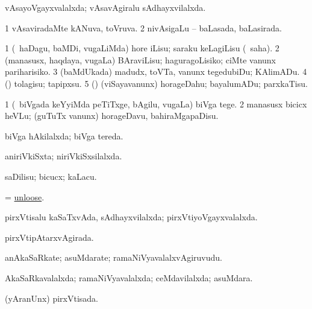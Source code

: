 \bentry
{} 
\gl{\gu}
\expl{}
\bmng
vAsayoVgayxvalalxda; vAsavAgiralu sAdhayxvilalxda. 
\emng
\eentry

\bentry
{} 
\gl{\gu}
\expl{}
\bmng
\bnum
\num{1} vAsaviradaMte kANuva, toVruva. 
\num{2} nivAsigaLu -- baLasada, baLasirada. 
\enum
\emng
\eentry

\bentry
{} 
\gl{\sakirx}
\expl{}
\bmng
\bnum
\num{1} (\kanmu\ haDagu, baMDi, \mo vugaLiMda) hore iLisu; saraku keLagiLisu (\akirx\ saha). 
\num{2} (manasusx, haqdaya, \mo vugaLa) BAraviLisu; haguragoLisiko; ciMte \mo vanunx pariharisiko. 
\num{3} (baMdUkada) madudx, toVTa, \mo vanunx tegedubiDu; KAlimADu. 
\num{4} (\AmA) tolagisu; tapipxsu. 
\num{5} (\AmA) (viSayavanunx) horageDahu; bayalumADu; parxkaTisu. 
\enum
\emng
\eentry

\bentry
{} 
\gl{\sakirx}
\expl{}
\bmng
\bnum
\num{1} (\kanmu\ biVgada keYyiMda peTiTxge, bAgilu, \mo vugaLa) biVga tege. 
\num{2} manasusx bicicx heVLu; (guTuTx \mo vanunx) horageDavu, bahiraMgapaDisu. 
\enum
\emng
\eentry

\bentry
{} 
\gl{\gu}
\expl{}
\bmng
biVga hAkilalxda; biVga tereda. 
\emng
\eentry

\bentry
{} 
\gl{\gu}
\expl{}
\bmng
aniriVkiSxta; niriVkiSxsilalxda. 
\emng
\eentry

\bentry
{} 
\gl{\sakirx}
\expl{}
\bmng
saDilisu; bicucx; kaLacu. 
\emng
\eentry

\bentry
{} 
\gl{\sakirx}
\expl{}
\bmng
= \hyperlink{unloose}{unloose}. 
\emng
\eentry

\bentry
{} 
\gl{\gu}
\expl{}
\bmng
pirxVtisalu kaSaTxvAda, sAdhayxvilalxda; pirxVtiyoVgayxvalalxda. 
\emng
\eentry

\bentry
{} 
\gl{\gu}
\bmng
pirxVtipAtarxvAgirada. 
\emng
\eentry

\bentry
{} 
\gl{\nA}
\expl{}
\bmng
anAkaSaRkate; asuMdarate; ramaNiVyavalalxvAgiruvudu. 
\emng
\eentry

\bentry
{} 
\gl{\gu}
\bmng
AkaSaRkavalalxda; ramaNiVyavalalxda; ceMdavilalxda; asuMdara. 
\emng
\eentry

\bentry
{} 
\gl{\gu}
\bmng
(yAranUnx) pirxVtisada. 
\emng
\eentry

